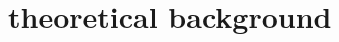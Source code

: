 \documentclass[\main/master.tex]{subfiles}
\begin{document}
\chapter{theoretical background}\label{chp:example-2}
\end{document}
